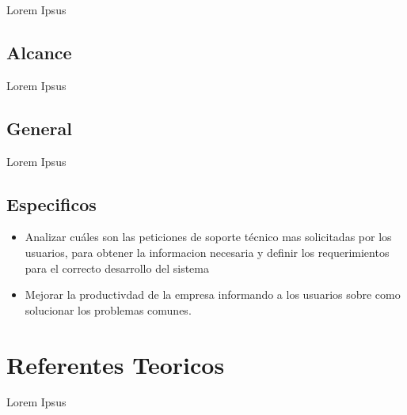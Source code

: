 \documentclass[preprint,12pt]{elsarticle}
\begin{document}
Lorem Ipsus


\subsection {\textbf{Alcance}}
Lorem Ipsus




\subsection{\textbf{General}}

Lorem Ipsus


\subsection{\textbf{Especificos}}

\begin{itemize}

\item Analizar cuáles son las peticiones de soporte técnico mas solicitadas por los usuarios, para obtener la informacion necesaria y definir los requerimientos para el correcto desarrollo del sistema
\item Mejorar la productivdad de la empresa informando a los usuarios sobre como solucionar los problemas comunes.
\end{itemize}


 


\section{Referentes Teoricos}
Lorem Ipsus
\end{document}
